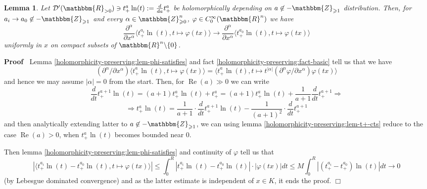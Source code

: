 \documentclass{article}
\newcommand{\assign}{:=}
\newcommand{\nin}{\not\in}
\newcommand{\tmop}[1]{\ensuremath{\operatorname{#1}}}
\newenvironment{proof}{\noindent\textbf{Proof\ }}{\hspace*{\fill}$\Box$\medskip}
\numberwithin{definition}{section}
\newtheorem{lemma}{Lemma}
\numberwithin{lemma}{section}
\numberwithin{proposition}{section}
{\theorembodyfont{\rmfamily}\newtheorem{remark}{Remark}
\numberwithin{remark}{section}
}
\begin{document}
\begin{lemma}
  \label{holomorphicity-preserving:lem-t+ln-cts}Let $\mathcal{D}' (
  \mathbbm{R}_{> 0}) \ni t_+^a \ln ( t) \assign \frac{d}{d a} t_+^a$ be
  holomorphically depending on $a \nin -\mathbbm{Z}_{\geqslant 1}$
  distribution. Then, for $a_i \rightarrow a_0 \nin -\mathbbm{Z}_{\geqslant
  1}$ and every $\alpha \in \mathbbm{Z}_{\geqslant 0}^n$, $\varphi \in
  C_0^{\infty} ( \mathbbm{R}^n)$ we have
  \[ \frac{\partial^{\alpha}}{\partial x^{\alpha}} \langle t_+^{a_i} \ln ( t),
     t \mapsto \varphi ( t x) \rangle \rightarrow
     \frac{\partial^{\alpha}}{\partial x^{\alpha}} \langle t_+^{a_0} \ln ( t),
     t \mapsto \varphi ( t x) \rangle \]
  uniformly in $x$ on compact subsets of $\mathbbm{R}^n \backslash \{ 0 \}$.
\end{lemma}

\begin{proof}
  Lemma \ref{holomorphicity-preserving:lem-phi-satisfies} and fact
  \ref{holomorphicity-preserving:fact-basic} tell us that we have
  \[ ( \partial^{\alpha} / \partial x^{\alpha}) \langle t_+^{a_{}} \ln ( t),
     t \mapsto \varphi ( t x) \rangle = \langle t_+^{a_{}} \ln ( t), t \mapsto
     t^{| \alpha |} ( \partial^{\alpha} \varphi / \partial x^{\alpha}) \varphi
     ( t x) \rangle \]
  and hence we may assume $| \alpha | = 0$ from the start. Then, for
  $\tmop{Re} ( a) \gg 0$ we can write
  \[ \frac{d}{d t} t_+^{a + 1} \ln ( t) = ( a + 1) t_+^a \ln ( t) + t_+^a = (
     a + 1) t_+^a \ln ( t) + \frac{1}{a + 1} \frac{d}{d t} t_+^{a + 1}
     \Rightarrow \]
  \[ \Rightarrow t_+^a \ln ( t) = \frac{1}{a + 1} \cdot \frac{d}{d t} t_+^{a +
     1} \ln ( t) - \frac{1}{( a + 1)^2} \cdot \frac{d}{d t} t^{a + 1}_+ \]
  and then analytically extending latter to $a \nin -\mathbbm{Z}_{\geqslant
  1}$, we can using lemma \ref{holomorphicity-preserving:lem-t+-cts} reduce to
  the case $\tmop{Re} ( a) > 0$, when $t_+^a \ln ( t)$ becomes bounded near
  $0$.
  
  Then lemma \ref{holomorphicity-preserving:lem-phi-satisfies} and continuity
  of $\varphi$ tell us that
  \[ | \langle t_+^{a_i} \ln ( t) - t_+^{a_0} \ln ( t), t \mapsto \varphi ( t
     x) \rangle | \leqslant \int_0^R | t_+^{a_i} \ln ( t) - t_+^{a_0} \ln ( t)
     | \cdot | \varphi ( t x) | d t \leqslant M \int_0^R | ( t_+^{a_i} -
     t_+^{a_0}) \ln ( t) | d t \rightarrow 0 \]
  (by Lebesgue dominated convergence) and as the latter estimate is
  independent of $x \in K$, it ends the proof.
\end{proof}
\end{document}
